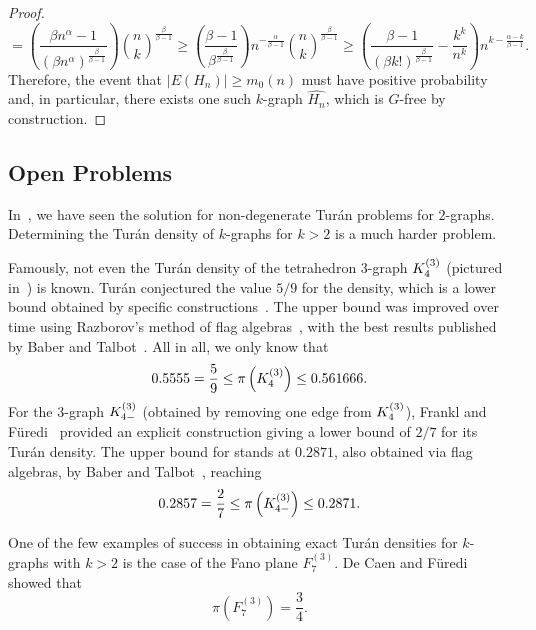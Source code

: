 \begin{proposition}
\begin{proof}
\[            = \left( \frac{\beta n^{\alpha} - 1}{\left( \beta n^{\alpha} \right)^\frac{\beta}{\beta-1}} \right) \binom{n}{k}^{\frac{\beta}{\beta-1}}
            \geq \left( \frac{\beta - 1}{\beta^{\frac{\beta}{\beta - 1}}} \right) n^{- \frac{\alpha}{\beta - 1}} \binom{n}{k}^{\frac{\beta}{\beta - 1}}
            \geq \left( \frac{\beta - 1}{(\beta k!)^{\frac{\beta}{\beta - 1}}}  - \frac{k^k}{n^k} \right) n^{k - \frac{\alpha - k}{\beta - 1}}.
        \]
        Therefore, the event that $|E(H_n)| \geq m_0(n)$
        must have positive probability and, in particular,
        there exists one such $k$-graph $\widehat{H_n}$, which is $G$-free by construction.
    \end{proof}
\end{proposition}

\subsection{Open Problems}\label{subsec:open-problems} %

In~, we have
seen the solution for non-degenerate Turán problems for $2$-graphs.
Determining the Turán density of $k$-graphs for $k > 2$ is a much harder problem.

Famously, not even the Turán density of the tetrahedron $3$-graph $K^{(3)}_{4}$
(pictured in~) is known.
Turán conjectured the value $5/9$ for the density, which is a lower bound obtained by specific constructions~\cite{keevash2011hypergraph}.
The upper bound was improved over time using Razborov's method of flag algebras~\cite{razborov2007flag},
with the best results published by Baber and Talbot~\cite{baber2011hypergraphs}.
All in all, we only know that
\[
    0.5555 = \frac{5}{9}
    \leq \pi\left(K^{(3)}_{4}\right)
    \leq 0.561666.
\]
For the $3$-graph $K^{(3)}_{4-}$ (obtained by removing one edge from $K^{(3)}_{4}$),
Frankl and Füredi~\cite{frankl1984exact} provided an explicit construction giving a lower bound of $2/7$ for its Turán density.
The upper bound for stands at $0.2871$, also obtained via flag algebras,
by Baber and Talbot~\cite{baber2011hypergraphs}, reaching
\[
     0.2857 = \frac{2}{7}
     \leq \pi\left(K^{(3)}_{4-}\right)
     \leq 0.2871.
\]

One of the few examples of success in obtaining exact Turán densities for $k$-graphs with $k > 2$ is the case of
the Fano plane $F^{(3)}_7$.
De Caen and Füredi~\cite{de2000maximum} showed that
\[
    \pi\left(F^{(3)}_7\right) = \frac{3}{4}.
\]

